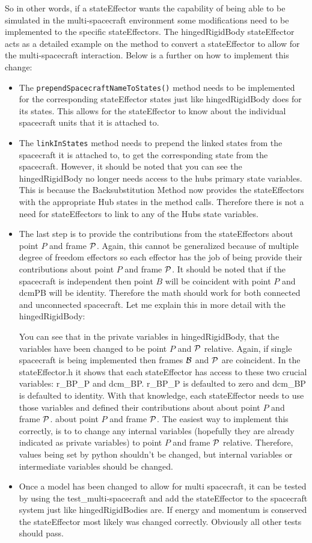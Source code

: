 \begin{itemize}
	So in other words, if a stateEffector wants the capability of being able to be simulated in the multi-spacecraft environment some modifications need to be implemented to the specific stateEffectors. The hingedRigidBody stateEffector acts as a detailed example on the method to convert a stateEffector to allow for the multi-spacecraft interaction. Below is a further on how to implement this change:
	\begin{itemize}
		\item The {\tt prependSpacecraftNameToStates()} method needs to be implemented for the corresponding stateEffector states just like hingedRigidBody does for its states. This allows for the stateEffector to know about the individual spacecraft units that it is attached to.
		\item The {\tt linkInStates} method needs to prepend the linked states from the spacecraft it is attached to, to get the corresponding state from the spacecraft. However, it should be noted that you can see the hingedRigidBody no longer needs access to the hubs primary state variables. This is because the Backsubstitution Method now provides the stateEffectors with the appropriate Hub states in the method calls. Therefore there is not a need for stateEffectors to link to any of the Hubs state variables.
		\item The last step is to provide the contributions from the stateEffectors about point $P$ and frame $\cal P$. Again, this cannot be generalized because of multiple degree of freedom effectors so each effector has the job of being provide their contributions about point $P$ and frame $\cal P$. It should be noted that if the spacecraft is independent then point $B$ will be coincident with point $P$ and dcmPB will be identity. Therefore the math should work for both connected and unconnected spacecraft. Let me explain this in more detail with the hingedRigidBody:

		You can see that in the private variables in hingedRigidBody, that the variables have been changed to be point $P$ and $\cal P$ relative. Again, if single spacecraft is being implemented then frames $\cal B$ and $\cal P$ are coincident. In the stateEffector.h it shows that each stateEffector has access to these two crucial variables: r\_BP\_P and dcm\_BP. r\_BP\_P is defaulted to zero and dcm\_BP is defaulted to identity. With that knowledge, each stateEffector needs to use those variables and defined their contributions about about point $P$ and frame $\cal P$. about point $P$ and frame $\cal P$. The easiest way to implement this correctly, is to to change any internal variables (hopefully they are already indicated as private variables) to point $P$ and frame $\cal P$ relative. Therefore, values being set by python shouldn't be changed, but internal variables or intermediate variables should be changed.
		\item Once a model has been changed to allow for multi spacecraft, it can be tested by using the test\_multi-spacecraft and add the stateEffector to the spacecraft system just like hingedRigidBodies are. If energy and momentum is conserved the stateEffector most likely was changed correctly. Obviously all other tests should pass.
	\end{itemize}


\end{itemize}
